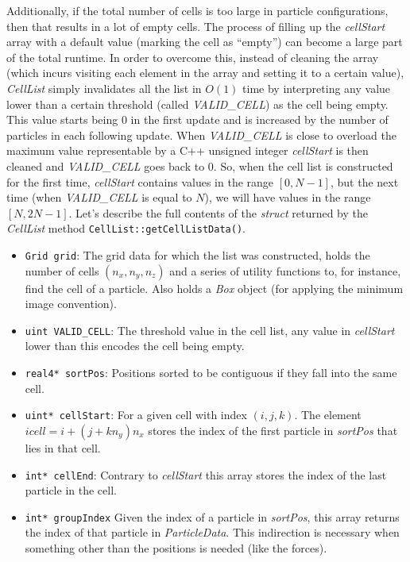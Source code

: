 \documentclass[ twoside,openright,titlepage,numbers=noenddot,%
headinclude,footinclude,cleardoublepage=empty,abstract=on,
BCOR=5mm,paper=b5,fontsize=11pt, dvipsnames
]{scrreprt}
\def\ucpp{uammd_cpp_lexer.py:UAMMDCppLexer -x}
\begin{document}
Additionally, if the total number of cells is too large in particle configurations, then that results in a lot of empty cells. The process of filling up the \emph{cellStart} array with a default value (marking the cell as ``empty'') can become a large part of the total runtime. In order to overcome this, instead of cleaning the array (which incurs visiting each element in the array and setting it to a certain value), \emph{CellList} simply invalidates all the list in $O(1)$ time by interpreting any value lower than a certain threshold (called \emph{VALID\_CELL}) as the cell being empty.
This value starts being $0$ in the first update and is increased by the number of particles in each following update. When \emph{VALID\_CELL} is close to overload the maximum value representable by a C++ unsigned integer \emph{cellStart} is then cleaned and \emph{VALID\_CELL} goes back to $0$. So, when the cell list is constructed for the first time, \emph{cellStart} contains values in the range $[0, N-1]$, but the next time (when \emph{VALID\_CELL} is equal to $N$), we will have values in the range $[N, 2N-1]$.
Let's describe the full contents of the \emph{struct} returned by the \emph{CellList} method \texttt{CellList::getCellListData()}.
\begin{itemize}
\item\texttt{Grid grid}:
  The grid data for which the list was constructed, holds the number of cells $(n_x, n_y, n_z)$ and a series of utility functions to, for instance, find the cell of a particle. Also holds a \emph{Box} object (for applying the minimum image convention).
\item\texttt{uint VALID_CELL}:
  The threshold value in the cell list, any value in \emph{cellStart} lower than this encodes the cell being empty. 
\item\texttt{real4* sortPos}:
  Positions sorted to be contiguous if they fall into the same cell. 
\item\texttt{uint* cellStart}:
  For a given cell with index $(i,j,k)$. The element $icell = i + (j + kn_y)n_x$ stores the index of the first particle in \emph{sortPos} that lies in that cell.
\item\texttt{int* cellEnd}:
  Contrary to \emph{cellStart} this array stores the index of the last particle in the cell.
\item\texttt{int* groupIndex}
  Given the index of a particle in \emph{sortPos}, this array returns the index of that particle in \emph{ParticleData}.
  This indirection is necessary when something other than the positions is needed (like the forces).
\end{itemize}
\end{document}
